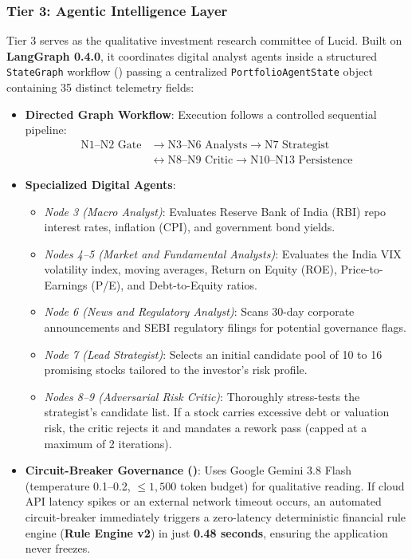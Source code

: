 \subsubsection{Tier 3: Agentic Intelligence Layer}
Tier 3 serves as the qualitative investment research committee of Lucid. Built on \textbf{LangGraph 0.4.0}, it coordinates digital analyst agents inside a structured \texttt{StateGraph} workflow () passing a centralized \texttt{PortfolioAgentState} object containing 35 distinct telemetry fields:
\begin{itemize}
    \item \textbf{Directed Graph Workflow}: Execution follows a controlled sequential pipeline:
    \begin{equation}
    \begin{aligned}
        \text{N1--N2 Gate} &\longrightarrow \text{N3--N6 Analysts} \longrightarrow \text{N7 Strategist} \\
        &\longleftrightarrow \text{N8--N9 Critic} \longrightarrow \text{N10--N13 Persistence}
    \end{aligned}
    \end{equation}
    \item \textbf{Specialized Digital Agents}:
    \begin{itemize}
        \item \textit{Node 3 (Macro Analyst)}: Evaluates Reserve Bank of India (RBI) repo interest rates, inflation (CPI), and government bond yields.
        \item \textit{Nodes 4--5 (Market and Fundamental Analysts)}: Evaluates the India VIX volatility index, moving averages, Return on Equity (ROE), Price-to-Earnings (P/E), and Debt-to-Equity ratios.
        \item \textit{Node 6 (News and Regulatory Analyst)}: Scans 30-day corporate announcements and SEBI regulatory filings for potential governance flags.
        \item \textit{Node 7 (Lead Strategist)}: Selects an initial candidate pool of 10 to 16 promising stocks tailored to the investor's risk profile.
        \item \textit{Nodes 8--9 (Adversarial Risk Critic)}: Thoroughly stress-tests the strategist's candidate list. If a stock carries excessive debt or valuation risk, the critic rejects it and mandates a rework pass (capped at a maximum of 2 iterations).
    \end{itemize}
    \item \textbf{Circuit-Breaker Governance ()}: Uses Google Gemini 3.8 Flash (temperature 0.1--0.2, $\le 1,500$ token budget) for qualitative reading. If cloud API latency spikes or an external network timeout occurs, an automated circuit-breaker immediately triggers a zero-latency deterministic financial rule engine (\textbf{Rule Engine v2}) in just \textbf{0.48 seconds}, ensuring the application never freezes.

\end{itemize}
